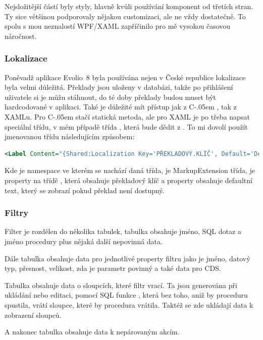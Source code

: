 \documentclass[czech,bachelor,dept460,male,csharp]{diploma}
\newcommand{\EvolioEight}{Evolio~8}
\newcommand{\Csharp}{%
  {\settoheight{\dimen0}{C}C\kern-.05em \resizebox{!}{\dimen0}{\raisebox{\depth}{\#}}}}
\newcommand{\un}{\underline{ }}
\begin{document}
			Nejsložitější částí byly styly, hlavně kvůli používání komponent od třetích stran. Ty sice většinou podporovaly nějakou customizaci, ale ne vždy dostatečně. To spolu s mou neznalostí WPF/XAML zapříčinilo pro mě vysokou časovou náročnost.
		\subsubsection{Lokalizace}
			Poněvadž aplikace {\EvolioEight} byla používána nejen v České republice lokalizace byla velmi důležitá. Překlady jsou uloženy v databázi, takže po přihlášení uživatele si je můžu stáhnout, do té doby překlady budou muset být hardcodované v aplikaci. Také je důležité mít přístup jak z {\Csharp}, tak z XAMLu. Pro {\Csharp} stačí statická metoda, ale pro XAML je po třeba napsat speciální třídu, v mém případě třída , která bude dědit z . To mi dovolí použít jmenovanou třídu následujícím způsobem:
			\begin{lstlisting}[language=XML,caption={MarkupExtension příkad},label=MarkupExtension]
<Label Content="{Shared:Localization Key='PŘEKLADOVÝ.KLÍČ', Default='Defaultní text'}"/>
			\end{lstlisting}
			 Kde  je namespace ve kterém se nachází daná třída,  je MarkupExtension třída,  je property na třídě , která obsahuje překladový klíč a property  obsahuje defaultní text, který se zobrazí pokud překlad není dostupný.
		\subsubsection{Filtry}
			Filter je rozdělen do několika tabulek, tabulka  obsahuje jméno, SQL dotaz a jméno procedury plus nějaká další nepovinná data. 
			
			Dále tabulka  obsahuje data pro jednotlivé property filtru jako je jméno, datový typ, přesnost, velikost, zda je parametr povinný a také data pro CDS. 
			
			Tabulka  obsahuje data o sloupcích, které filtr vrací. Ta jsou generována při ukládání nebo editaci, pomocí SQL funkce \uv{sys.sp{\un}describe{\un}first{\un}result{\un}set}, která bez toho, aniž by proceduru spustila, vrátí sloupce, které by procedura vrátila. Taktéž se zde ukládají data k zobrazení sloupců. 
			
			A nakonec tabulka  obsahuje data k nepárovaným akcím.
	
\end{document}
